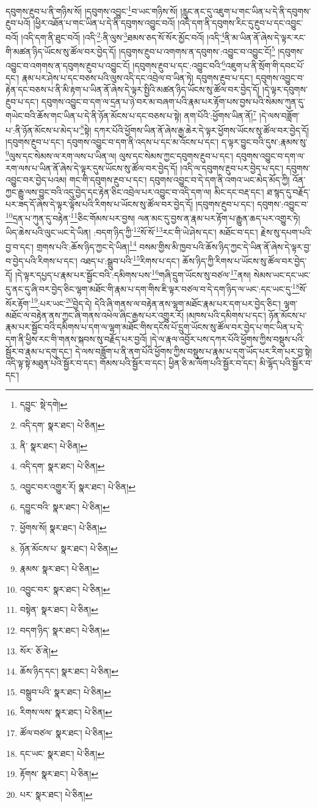 དབུགས་རྔུབ་པ་ནི་གཉིས་སོ། །དབུགས་འབྱུང་\footnote{དབྱུང་  སྡེ་དགེ། }བ་ཡང་གཉིས་སོ། །རླུང་ནང་དུ་འཇུག་པ་གང་ཡིན་པ་དེ་ནི་དབུགས་རྔུབ་པའོ། །ཕྱིར་འཐོན་པ་གང་ཡིན་པ་དེ་ནི་དབུགས་འབྱུང་བའོ། །འདི་དག་ནི་དབུགས་རིང་དུ་རྔུབ་པ་དང་འབྱུང་བའོ། །འདི་དག་ནི་ཐུང་བའོ། །འདི་\footnote{འདི་དག་  སྣར་ཐང་།  པེ་ཅིན། }:ནི་ལུས་\footnote{ནི་  སྣར་ཐང་།  པེ་ཅིན། }ཐམས་ཅད་སོ་སོར་མྱོང་བའོ། །འདི་\footnote{འདི་དག་  སྣར་ཐང་།  པེ་ཅིན། }ནི་མ་ཡིན་ནོ་ཞེས་དེ་ལྟར་རང་གི་མཚན་ཉིད་ཡོངས་སུ་ཚོལ་བར་བྱེད་དོ། །དབུགས་རྔུབ་པ་འགགས་ན་དབུགས་:འབྱུང་བ་འབྱུང་ངོ།\footnote{འབྱུང་བར་འགྱུར་རོ།  སྣར་ཐང་།  པེ་ཅིན། } །དབུགས་འབྱུང་བ་འགགས་ན་དབུགས་རྔུབ་པ་འབྱུང་ངོ། །དབུགས་རྔུབ་པ་དང་:འབྱུང་བའི་\footnote{དབྱུང་བའི་  སྣར་ཐང་།  པེ་ཅིན། }འཇུག་པ་ནི་སྲོག་གི་དབང་པོ་དང་། རྣམ་པར་ཤེས་པ་དང་བཅས་པའི་ལུས་འདི་དང་འབྲེལ་བ་ཡིན་ཏེ། དབུགས་རྔུབ་པ་དང་། དབུགས་འབྱུང་བ་རྟེན་དང་བཅས་པ་ནི་མི་རྟག་པ་ཡིན་ནོ་ཞེས་དེ་ལྟར་སྤྱིའི་མཚན་ཉིད་ཡོངས་སུ་ཚོལ་བར་བྱེད་དོ། །དེ་ལྟར་དབུགས་རྔུབ་པ་དང་། དབུགས་འབྱུང་བ་དག་ལ་དྲན་པ་ཉེ་བར་མ་བཞག་པའི་རྣམ་པར་རྟོག་པས་བྱས་པའི་སེམས་ཀུན་དུ་གཡེང་བའི་ཆོས་གང་ཡིན་པ་དེ་ནི་ཉོན་མོངས་པ་དང་བཅས་པ་སྟེ། ནག་པོའི་:ཕྱོགས་ཡིན་ནོ།\footnote{ཕྱོགས་སོ།  སྣར་ཐང་།  པེ་ཅིན། } །དེ་ལས་བཟློག་པ་:ནི་ཉོན་མོངས་པ་མེད་པ་\footnote{ཉོན་མོངས་པ་  སྣར་ཐང་།  པེ་ཅིན། }སྟེ། དཀར་པོའི་ཕྱོགས་ཡིན་ནོ་ཞེས་རྒྱ་ཆེར་དེ་ལྟར་ཕྱོགས་ཡོངས་སུ་ཚོལ་བར་བྱེད་དོ། །དབུགས་རྔུབ་པ་དང་། དབུགས་འབྱུང་བ་དག་ནི་འདས་པ་དང་མ་འོངས་པ་དང་། ད་ལྟར་བྱུང་བའི་དུས་:རྣམས་སུ་\footnote{རྣམས་  སྣར་ཐང་།  པེ་ཅིན། }ལུས་དང་སེམས་ལ་རག་ལས་པ་ཡིན་ལ། ལུས་དང་སེམས་ཀྱང་དབུགས་རྔུབ་པ་དང་། དབུགས་འབྱུང་བ་དག་ལ་རག་ལས་པ་ཡིན་ནོ་ཞེས་དེ་ལྟར་དུས་ཡོངས་སུ་ཚོལ་བར་བྱེད་དོ། །འདི་ལ་དབུགས་རྔུབ་པར་བྱེད་པ་དང་། དབུགས་འབྱུང་བར་བྱེད་པའམ། གང་གི་དབུགས་རྔུབ་པ་དང་། དབུགས་འབྱུང་བ་དེ་དག་ནི་འགའ་ཡང་མེད་མོད་ཀྱི། འོན་ཀྱང་རྒྱུ་ལས་བྱུང་བའི་འདུ་བྱེད་དང་རྟེན་ཅིང་འབྲེལ་པར་འབྱུང་བ་འདི་དག་ལ། མིང་དང་བརྡ་དང་། ཐ་སྙད་དུ་བརྗོད་པར་ཟད་དོ་ཞེས་དེ་ལྟར་ལྟོས་པའི་རིགས་པ་ཡོངས་སུ་ཚོལ་བར་བྱེད་དོ། །དབུགས་རྔུབ་པ་དང་། དབུགས་:འབྱུང་བ་\footnote{འབྱུང་བར་  སྣར་ཐང་།  པེ་ཅིན། }དྲན་པ་ཀུན་དུ་བརྟེན་\footnote{བསྟེན་  སྣར་ཐང་།  པེ་ཅིན། }ཅིང་གོམས་པར་བྱས། ལན་མང་དུ་བྱས་ན་རྣམ་པར་རྟོག་པ་རྒྱུན་ཆད་པར་འགྱུར་ཏེ། ཡིད་ཆེས་པའི་ལུང་ཡང་དེ་ཡིན། :བདག་ཉིད་ཀྱི་\footnote{བདག་ཉིད་  སྣར་ཐང་།  པེ་ཅིན། }སོ་སོ་\footnote{སོར་  ཅོ་ནེ། }རང་གི་ཡེ་ཤེས་དང་། མཐོང་བ་དང་། རྗེས་སུ་དཔག་པའི་བྱ་བ་དང་། གྲགས་པའི་:ཆོས་ཉིད་ཀྱང་དེ་ཡིན།\footnote{ཆོས་ཉིད་དང་།  སྣར་ཐང་།  པེ་ཅིན། } བསམ་གྱིས་མི་ཁྱབ་པའི་ཆོས་ཉིད་ཀྱང་དེ་ཡིན་ནོ་ཞེས་དེ་ལྟར་བྱ་བ་བྱེད་པའི་རིགས་པ་དང་། འཐད་པ་:སྒྲུབ་པའི་\footnote{བསྒྲུབ་པའི་  སྣར་ཐང་།  པེ་ཅིན། }རིགས་པ་དང་། ཆོས་ཉིད་ཀྱི་རིགས་པ་ཡོངས་སུ་ཚོལ་བར་བྱེད་དོ། །དེ་ལྟར་དཔྱད་པ་རྣམ་པར་སྦྱོང་བའི་:དམིགས་པས་\footnote{རིགས་ལས་  སྣར་ཐང་།  པེ་ཅིན། }གཞི་དྲུག་ཡོངས་སུ་བཙལ་\footnote{ཚོལ་བཙལ་  སྣར་ཐང་།  པེ་ཅིན། }ནས། སེམས་ཡང་དང་ཡང་དུ་ནང་དུ་ཞི་བར་བྱེད་ཅིང་ལྷག་མཐོང་གི་རྣམ་པ་དག་གིས་ཇི་ལྟར་བཙལ་བ་དེ་དག་ཉིད་ལ་ཡང་:དང་ཡང་དུ་\footnote{དང་ཡང་  སྣར་ཐང་།  པེ་ཅིན། }སོ་སོར་རྟོག་\footnote{རྟོགས་  སྣར་ཐང་།  པེ་ཅིན། }:པར་ཡང་\footnote{པར་  སྣར་ཐང་།  པེ་ཅིན། }བྱེད་དེ། དེའི་ཞི་གནས་ལ་བརྟེན་ནས་ལྷག་མཐོང་རྣམ་པར་དག་པར་བྱེད་ཅིང་། ལྷག་མཐོང་ལ་བརྟེན་ནས་ཀྱང་ཞི་གནས་འཕེལ་ཞིང་རྒྱས་པར་འགྱུར་རོ། །མཁས་པའི་དམིགས་པ་དང་། ཉོན་མོངས་པ་རྣམ་པར་སྦྱོང་བའི་དམིགས་པ་དག་ལ་ལྷག་མཐོང་གིས་དངོས་པོ་དྲུག་ཡོངས་སུ་ཚོལ་བར་བྱེད་པ་གང་ཡིན་པ་དེ་དག་ནི་ཕྱིས་རང་གི་གནས་སྐབས་སུ་བརྗོད་པར་བྱའོ། །དེ་ལ་རྣལ་འབྱོར་པས་དཀར་པོའི་ཕྱོགས་ཀྱིས་བསྡུས་པའི་སྦྱོར་བ་རྣམ་པ་དགུ་དང་། དེ་ལས་བཟློག་པ་ནི་ནག་པོའི་ཕྱོགས་ཀྱིས་བསྡུས་པ་རྣམ་པ་དགུ་ཡོད་པར་རིག་པར་བྱ་སྟེ། འདི་ལྟ་སྟེ་མཐུན་པའི་སྦྱོར་བ་དང་། གོམས་པའི་སྦྱོར་བ་དང་། ཕྱིན་ཅི་མ་ལོག་པའི་སྦྱོར་བ་དང་། མི་ལྷོད་པའི་སྦྱོར་བ་དང་། 